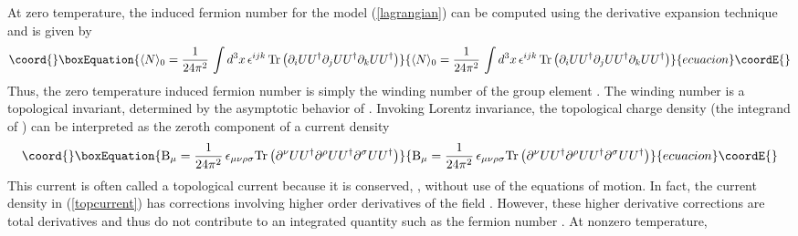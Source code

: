 \documentclass[a4paper,prd,showpacs,showkeys]{revtex4}
\begin{document}
At zero temperature, the induced fermion number for the model (\ref{lagrangian}) can be computed using the derivative expansion technique and is given by \cite{gold,niemi,diakonov,dhoker}
\begin{equation}\coord{}\boxEquation{
\langle N\rangle _0 =\frac{1}{24 \pi ^2}\, \int d^3x\, \epsilon ^{ijk}\, \textrm{Tr} \left(\partial _{i}U U^{\dagger} \partial _{j}U U^{\dagger}  \partial_{k}U U^{\dagger}\right)
\label{topcharge}
}{
\langle N\rangle _0 =\frac{1}{24 \pi ^2}\, \int d^3x\, \epsilon ^{ijk}\, \textrm{Tr} \left(\partial _{i}U U^{\dagger} \partial _{j}U U^{\dagger}  \partial_{k}U U^{\dagger}\right)
}{ecuacion}\coordE{}\end{equation}
Thus, the zero temperature induced fermion number is simply the winding number of the group element \coordHE{}. The winding number is a topological invariant, determined by the asymptotic behavior of \coordHE{}.  Invoking Lorentz invariance, the topological charge density (the integrand of \coordHE{}) can be interpreted as the zeroth component of a current density
\begin{equation}\coord{}\boxEquation{
\textrm{B} _{\mu} =\frac{1}{24 \pi ^2}\,  \epsilon _{\mu \nu \rho \sigma} \textrm{Tr} \left(\partial^{\nu}U U^{\dagger} \partial^{\rho}U U^{\dagger}  \partial^{\sigma}U U^{\dagger}\right)
\label{topcurrent}
}{
\textrm{B} _{\mu} =\frac{1}{24 \pi ^2}\,  \epsilon _{\mu \nu \rho \sigma} \textrm{Tr} \left(\partial^{\nu}U U^{\dagger} \partial^{\rho}U U^{\dagger}  \partial^{\sigma}U U^{\dagger}\right)
}{ecuacion}\coordE{}\end{equation} 
This current \coordHE{} is often called a topological current because it is conserved, \coordHE{},  without use of the equations of motion. 
In fact, the current density \coordHE{} in (\ref{topcurrent}) has corrections involving higher order derivatives of the field \coordHE{}. However, these
higher derivative corrections are total derivatives and
thus do not contribute to an integrated quantity such as the fermion
number \coordHE{} \cite{wilczek,diakonov}. At nonzero temperature, 
\end{document}
